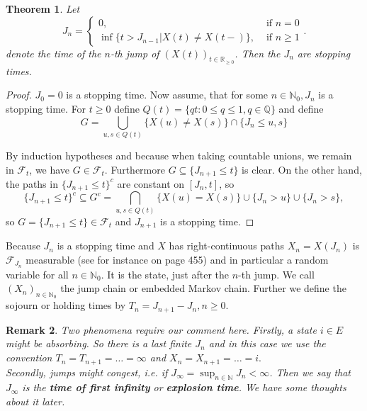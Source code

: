 \documentclass[12pt,a4paper]{scrartcl}
\newtheorem{theorem}{Theorem}[section]
\newtheorem {remark}[theorem]{Remark}
\numberwithin{equation}{section}
\newcommand{\R}{\mathbb{R}} %
\newcommand{\N}{\mathbb{N}} %
\begin{document}
\begin{theorem} Let
$$ J_n=\begin{cases} 0, & \mbox{ if } n = 0 \\ \inf \lbrace t > J_{n-1} | X\left(t\right) \neq X\left(t-\right) \rbrace, & \mbox{ if } n \geq 1 \end{cases}. $$
denote the time of the $n$-th jump of $\left(X\left(t\right)\right)_{t \in \R_{\geq 0}}$. Then the $J_n$ are stopping times.
\end{theorem}
\begin{proof}
$J_0 = 0$ is a stopping time.
Now assume, that for some $ n \in \N_0 , J_n $ is a stopping time. For $ t \geq 0 $ define $ Q\left(t\right) = \lbrace  qt : 0 \leq q \leq 1, q \in \mathbb{Q} \rbrace  $ and define
\begin{equation}
G = \bigcup_{u,s \in Q\left(t\right)} \lbrace X\left(u\right) \neq X\left(s\right)  \rbrace  \cap \lbrace J_{n} \leq u,s \rbrace 
\end{equation}

By induction hypotheses and because when taking countable unions, we remain in $ \mathcal{F}_t $, we have $ G \in \mathcal{F}_t $. Furthermore $ G \subseteq \lbrace J_{n+1} \leq t \rbrace  $ is clear.
On the other hand, the paths in  $\lbrace J_{n+1} \leq t \rbrace ^c $ are constant on $ \left[J_n, t\right] $, so
$$ \lbrace J_{n+1} \leq t \rbrace ^c \subseteq G^c = \bigcap_{u,s \in Q\left(t\right)} \lbrace  X\left(u\right) = X\left(s\right)  \rbrace  \cup \lbrace J_n > u \rbrace \cup \lbrace J_n > s \rbrace  ,$$ so $ G = \lbrace J_{n+1} \leq t \rbrace  \in \mathcal{F}_t $ and $ J_{n+1} $ is a stopping time.
\end{proof}

Because $J_n$ is a stopping time and $X$ has right-continuous paths $X_n = X\left(J_n\right)$ is $\mathcal{F}_{J_n}$ measurable (see for instance \cite{klenke} on page 455) and in particular a random variable for all $n \in \N_0$. It is the state, just after the $n$-th jump. We call $ \left(X_n\right)_{n \in \N_0}  $ the jump chain or embedded Markov chain.
Further we define the sojourn or holding times by $ T_n = J_{n+1} - J_n , n \geq 0 $.

\begin{remark}
Two phenomena require our comment here. Firstly, a state $ i \in E $ might be absorbing. So there is a last finite $ J_n $ and in this case we use the convention $T_n = T_{n+1} = \ldots = \infty$ and $X_n = X_{n+1} = \ldots = i.$ \\
Secondly, jumps might congest, i.e. if $ J_{\infty} = \sup_{n \in \N} J_n < \infty $. Then we say that $ J_{\infty} $ is the \textbf{time of first infinity} or \textbf{explosion time}. We have some thoughts about it later.
\end{remark}
\end{document}
